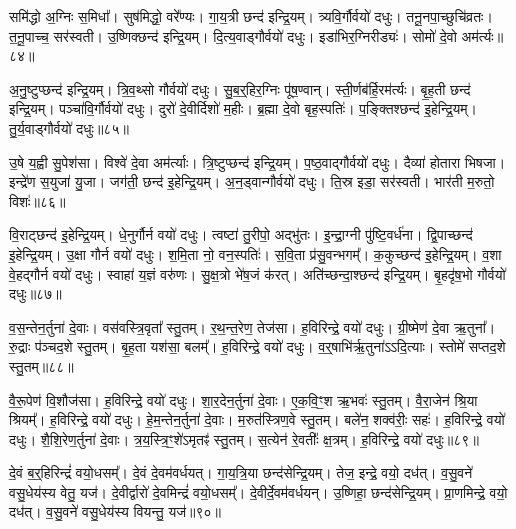 समि॑द्धो अ॒ग्निः स॒मिधा᳚।
सुष॑मिद्धो॒ वरे᳚ण्यः।
गा॒य॒त्री छन्द॑ इन्द्रि॒यम्।
त्र्यवि॒र्गौर्वयो॑ दधुः।
तनू॒नपा॒च्छुचि॑व्रतः।
त॒नू॒पाच्च॒ सर॑स्वती।
उ॒ष्णिक्छन्द॑ इन्द्रि॒यम्।
दि॒त्य॒वाड्गौर्वयो॑ दधुः।
इडा॑भिर॒ग्निरीड्यः॑।
सोमो॑ दे॒वो अम॑र्त्यः॥८४॥

अ॒नु॒ष्टुप्छन्द॑ इन्द्रि॒यम्।
त्रि॒व॒थ्सो गौर्वयो॑ दधुः।
सु॒ब॒र्॒हिर॒ग्निः पू॑ष॒ण्वान्।
स्ती॒र्णब॑र्हि॒रम॑र्त्यः।
बृ॒ह॒ती छन्द॑ इन्द्रि॒यम्।
पञ्चा॑वि॒र्गौर्वयो॑ दधुः।
दुरो॑ दे॒वीर्दिशो॑ म॒हीः।
ब्र॒ह्मा दे॒वो बृह॒स्पतिः॑।
प॒ङ्क्तिश्छन्द॑ इ॒हेन्द्रि॒यम्।
तु॒र्य॒वाड्गौर्वयो॑ दधुः॥८५॥

उ॒षे य॒ह्वी सु॒पेश॑सा।
विश्वे॑ दे॒वा अम॑र्त्याः।
त्रि॒ष्टुप्छन्द॑ इन्द्रि॒यम्।
प॒ष्ठ॒वाद्गौर्वयो॑ दधुः।
दैव्या॑ होतारा भिषजा।
इन्द्रे॑ण स॒युजा॑ यु॒जा।
जग॑ती॒ छन्द॑ इ॒हेन्द्रि॒यम्।
अ॒न॒ड्वान्गौर्वयो॑ दधुः।
ति॒स्र इडा॒ सर॑स्वती।
भार॑ती म॒रुतो॒ विशः॑॥८६॥

वि॒राट्छन्द॑ इ॒हेन्द्रि॒यम्।
धे॒नुर्गौर्न वयो॑ दधुः।
त्वष्टा॑ तु॒रीपो॒ अद्भु॑तः।
इ॒न्द्रा॒ग्नी पु॑ष्टि॒वर्ध॑ना।
द्वि॒पाच्छन्द॑ इ॒हेन्द्रि॒यम्।
उ॒क्षा गौर्न वयो॑ दधुः।
श॒मि॒ता नो॒ वन॒स्पतिः॑।
स॒वि॒ता प्र॑सु॒वन्भगम्᳚।
क॒कुच्छन्द॑ इ॒हेन्द्रि॒यम्।
व॒शा वे॒हद्गौर्न वयो॑ दधुः।
स्वाहा॑ य॒ज्ञं वरु॑णः।
सु॒क्ष॒त्रो भे॑ष॒जं क॑रत्।
अति॑च्छन्दा॒श्छन्द॑ इन्द्रि॒यम्।
बृ॒हदृ॑ष॒भो गौर्वयो॑ दधुः॥८७॥\anuvakamend[अम॑र्त्यस्तुर्य॒वाड्गौर्वयो॑ दधु॒र्विशो॑ व॒शा वे॒हद्गौर्न वयो॑ दधुश्च॒त्वारि॑ च]

व॒स॒न्तेन॒र्तुना॑ दे॒वाः।
वस॑वस्त्रि॒वृता᳚ स्तु॒तम्।
र॒थ॒न्त॒रेण॒ तेज॑सा।
ह॒विरिन्द्रे॒ वयो॑ दधुः।
ग्री॒ष्मेण॑ दे॒वा ऋ॒तुना᳚।
रु॒द्राः प॑ञ्चद॒शे स्तु॒तम्।
बृ॒ह॒ता यश॑सा॒ बलम्᳚।
ह॒विरिन्द्रे॒ वयो॑ दधुः।
व॒र्॒षाभि॑र्\mbox{}ऋ॒तुना॑\-ऽऽदि॒त्याः।
स्तोमे॑ सप्तद॒शे स्तु॒तम्॥८८॥

वै॒रू॒पेण॑ वि॒शौज॑सा।
ह॒विरिन्द्रे॒ वयो॑ दधुः।
शा॒र॒देन॒र्तुना॑ दे॒वाः।
ए॒क॒वि॒ꣳ॒श ऋ॒भवः॑ स्तु॒तम्।
वै॒रा॒जेन॑ श्रि॒या श्रियम्᳚।
ह॒विरिन्द्रे॒ वयो॑ दधुः।
हे॒म॒न्तेन॒र्तुना॑ दे॒वाः।
म॒रुत॑स्त्रिण॒वे स्तु॒तम्।
बले॑न॒ शक्व॑रीः॒ सहः॑।
ह॒विरिन्द्रे॒ वयो॑ दधुः।
शै॒शि॒रेण॒र्तुना॑ दे॒वाः।
त्र॒य॒स्त्रि॒ꣳ॒शे॑\-ऽमृतꣴ॑ स्तु॒तम्।
स॒त्येन॑ रे॒वतीः᳚ क्ष॒त्रम्।
ह॒विरिन्द्रे॒ वयो॑ दधुः॥८९॥\anuvakamend[स्तोमे॑ सप्तद॒शे स्तु॒तꣳ सहो॑ ह॒विरिन्द्रे॒ वयो॑ दधुश्च॒त्वारि॑ च (व॒स॒न्तेन॑ ग्री॒ष्मेण॑ व॒र्‌॒\mbox{}षाभिः॑ शार॒देन॑ हेम॒न्तेन॑ शैशि॒रेण॒ षट्॥)]

दे॒वं ब॒र्॒हिरिन्द्रं॑ वयो॒धसम्᳚।
दे॒वं दे॒वम॑वर्धयत्।
गा॒य॒त्रि॒या छन्द॑सेन्द्रि॒यम्।
तेज॒ इन्द्रे॒ वयो॒ दध॑त्।
व॒सु॒वने॑ वसु॒धेय॑स्य वेतु॒ यज॑।
दे॒वीर्द्वारो॑ दे॒वमिन्द्रं॑ वयो॒धसम्᳚।
दे॒वीर्दे॒वम॑वर्धयन्।
उ॒ष्णिहा॒ छन्द॑सेन्द्रि॒यम्।
प्रा॒णमिन्द्रे॒ वयो॒ दध॑त्।
व॒सु॒वने॑ वसु॒धेय॑स्य वियन्तु॒ यज॑॥९०॥

